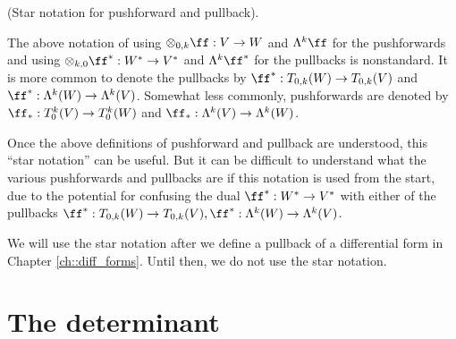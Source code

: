 \begin{remark}
\label{ch::exterior_pwrs::rmk::star_notation_pushforward_pullback}
    (Star notation for pushforward and pullback).
    
    The above notation of using $\otimes_{0, k} \ff:V \rightarrow W$ and $\Lambda^k \ff$ for the pushforwards and using ${\otimes_{k, 0} \ff^*:W^* \rightarrow V^*}$ and $\Lambda^k \ff^*$ for the pullbacks is nonstandard. It is more common to denote the pullbacks by ${\ff^*:T_{0,k}(W) \rightarrow T_{0,k}(V)}$ and ${\ff^*:\Lambda^k(W) \rightarrow \Lambda^k(V)}$. Somewhat less commonly, pushforwards are denoted by ${\ff_*:T^k_0(V) \rightarrow T^k_0(W)}$ and ${\ff_*:\Lambda^k(V) \rightarrow \Lambda^k(W)}$.
    
    Once the above definitions of pushforward and pullback are understood, this ``star notation'' can be useful. But it can be difficult to understand what the various pushforwards and pullbacks are if this notation is used from the start, due to the potential for confusing the dual $\ff^*:W^* \rightarrow V^*$ with either of the pullbacks ${\ff^*:T_{0,k}(W) \rightarrow T_{0,k}(V)}, {\ff^*:\Lambda^k(W) \rightarrow \Lambda^k(V)}$.
    
    We will use the star notation after we define a pullback of a differential form in Chapter \ref{ch::diff_forms}. Until then, we do not use the star notation.
\end{remark}

\newpage

\section{The determinant}

\label{ch::exterior_pwrs::determinant}

